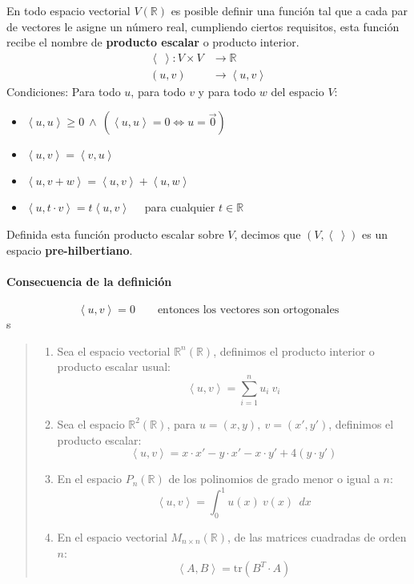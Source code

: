 En todo espacio vectorial \(V(\mathbb{R})\) es posible definir una función tal que a cada par de vectores le asigne un número real, cumpliendo ciertos requisitos, esta función recibe el nombre de \textbf{producto escalar} o producto interior.
\begin{align*}
  \left\langle ~\right\rangle  : V \times V &\rightarrow \mathbb{R} \\
  (u,v) & \rightarrow \left\langle u, v\right\rangle 
\end{align*}
Condiciones: Para todo \(u\), para todo \(v\) y para todo \(w\) del espacio \(V\):
\begin{itemize}
  \item \(\left\langle u,u \right\rangle \geq 0 ~ \land ~ \left(\left\langle u,u\right\rangle = 0 \Longleftrightarrow u = \vec{0}\right)\)
  \item \(\left\langle u,v\right\rangle = \left\langle v, u\right\rangle\)
  \item \(\left\langle u, v+w\right\rangle = \left\langle u,v\right\rangle + \left\langle u,w\right\rangle\)
  \item \(\left\langle u, t\cdot v\right\rangle = t \left\langle u,v\right\rangle \quad\) para cualquier \(t\in \mathbb{R}\) 
\end{itemize}
Definida esta función producto escalar sobre \(V\), decimos que \(\left(V, \left\langle ~ \right\rangle \right)\) es un espacio \textbf{pre-hilbertiano}.

\paragraph{Consecuencia de la definición}
\[
\left\langle u,v\right\rangle = 0 \qquad \text{entonces los vectores son ortogonales} 
\]
s
\begin{quote}
  \begin{enumerate}
    \item Sea el espacio vectorial \(\mathbb{R}^n (\mathbb{R})\), definimos el producto interior o producto escalar usual:
    \[
      \left\langle u,v\right\rangle = \sum_{i=1}^{n} u_i ~ v_i 
    \]
    \item Sea el espacio \(\mathbb{R}^2(\mathbb{R})\), para \(u = (x,y),~ v=(x',y')\), definimos el producto escalar:
    \[
      \left\langle u,v\right\rangle = x\cdot x' - y\cdot x' - x \cdot y' + 4 (y\cdot y') 
    \]
    \item En el espacio \(P_n (\mathbb{R})\) de los polinomios de grado menor o igual a \(n\):
    \[
      \left\langle u,v \right\rangle = \int_{0}^{1} u(x) ~ v(x) ~~ dx 
    \]
    \item En el espacio vectorial \(M_{n\times n} (\mathbb{R})\), de las matrices cuadradas de orden \(n\):
    \[
      \left\langle A, B\right\rangle = \text{tr} (B^T \cdot A) 
    \]
  \end{enumerate} 
\end{quote}


